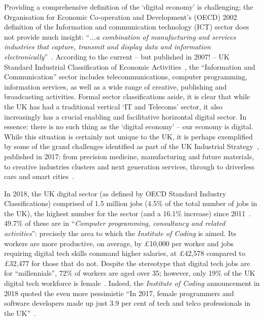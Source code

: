 \documentclass[conference]{IEEEtran}
\begin{document}
Providing a comprehensive definition of the `digital economy' is
challenging; the Organisation for Economic Co-operation and
Development's (OECD) 2002 definition of the Information and
communication technology (ICT) sector does not provide much insight:
``{\emph{...a combination of manufacturing and services industries
that capture, transmit and display data and information
electronically}}''~\cite{oecd:2002}.  According to the current -- but
published in 2007! -- UK Standard Industrial Classification of
Economic Activities~\cite{onssic:2009}, the ``Information and
Communication'' sector includes telecommunications, computer
programming, information services, as well as a wide range of
creative, publishing and broadcasting activities. Formal sector
classifications aside, it is clear that while the UK has had a
traditional vertical `IT and Telecoms' sector, it also increasingly
has a crucial enabling and facilitative horizontal digital sector. In
essence: there is no such thing as the `digital economy' -- our
economy is digital. While this situation is certainly not unique to
the UK, it is perhaps exemplified by some of the grand challenges
identified as part of the UK Industrial Strategy~\cite{ukis:2017},
published in 2017: from precision medicine, manufacturing and future
materials, to creative industries clusters and next generation
services, through to driverless cars and smart
cities~\cite{tryfonas+crick:petra2018}.


In 2018, the UK digital sector (as defined by OECD Standard
Industry Classifications) comprised of 1.5 million jobs (4.5\% of the
total number of jobs in the UK), the highest number for the sector
(and a 16.1\% increase) since 2011~\cite{dcms:2018}. 49.7\% of these
are in ``{\emph{Computer programming, consultancy and related
activities}}'': precisely the area to which the {\emph{Institute of Coding}} is
aimed. Its workers are more productive, on average, by \pounds10,000
per worker and jobs requiring digital tech skills command higher
salaries, at \pounds42,578 compared to \pounds32,477 for those that do
not. Despite the stereotype that digital tech jobs are for
``millennials'', 72\% of workers are aged over 35; however, only 19\%
of the UK digital tech workforce is
female~\cite{technation:2018}. Indeed, the {\emph{Institute of Coding}}
announcement in 2018 quoted the even more pessimistic ``In 2017,
female programmers and software developers made up just 3.9 per cent
of tech and telco professionals in the UK''~\cite{DfE2018a}.
\end{document}
